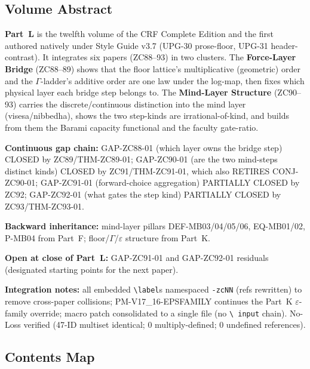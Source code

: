 \documentclass[11pt, a4paper]{article}
\begin{document}
\subsection*{Volume Abstract}

\begin{volumebox}[title={Part L --- CRF Complete Edition v17.16
  (Parts LVII--LIX)}]
\sloppy
\textbf{Part~L} is the twelfth volume of the CRF Complete Edition and the
first authored natively under Style Guide v3.7 (UPG-30 prose-floor, UPG-31
header-contrast). It integrates six papers (ZC88--93) in two clusters. The
\textbf{Force-Layer Bridge} (ZC88--89) shows that the floor lattice's
multiplicative (geometric) order and the $\Gamma$-ladder's additive order
are one law under the log-map, then fixes which physical layer each bridge
step belongs to. The \textbf{Mind-Layer Structure} (ZC90--93) carries the
discrete/continuous distinction into the mind layer (visesa/nibbedha),
shows the two step-kinds are irrational-of-kind, and builds from them the
Barami capacity functional and the faculty gate-ratio.

\textbf{Continuous gap chain:}
GAP-ZC88-01 (which layer owns the bridge step) CLOSED by ZC89/THM-ZC89-01;
GAP-ZC90-01 (are the two mind-steps distinct kinds) CLOSED by
ZC91/THM-ZC91-01, which also RETIRES CONJ-ZC90-01;
GAP-ZC91-01 (forward-choice aggregation) PARTIALLY CLOSED by ZC92;
GAP-ZC92-01 (what gates the step kind) PARTIALLY CLOSED by ZC93/THM-ZC93-01.

\textbf{Backward inheritance:} mind-layer pillars DEF-MB03/04/05/06,
EQ-MB01/02, P-MB04 from Part~F; floor/$\Gamma$/$\varepsilon$ structure from
Part~K.

\textbf{Open at close of Part~L:} GAP-ZC91-01 and GAP-ZC92-01 residuals
(designated starting points for the next paper).

\textbf{Integration notes:} all embedded \texttt{\textbackslash label}s
namespaced \texttt{-zcNN} (refs rewritten) to remove cross-paper
collisions; PM-V17\_16-EPSFAMILY continues the Part~K $\varepsilon$-family
override; macro patch consolidated to a single file (no \texttt{\textbackslash
input} chain). No-Loss verified (47-ID multiset identical; 0 multiply-defined;
0 undefined references).
\end{volumebox}

\subsection*{Contents Map}
\end{document}
